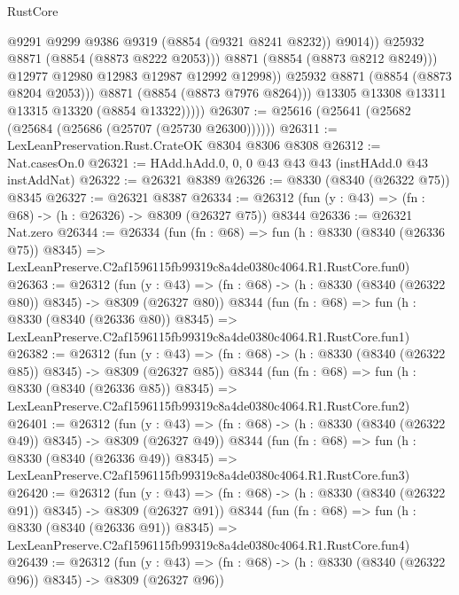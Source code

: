 \begin{lexlean}{RustCore}
\begin{coremodule}
                            @9291
                            @9299
                            @9386
                            @9319
                            (@8854 (@9321 @8241 @8232))
                            @9014))
                        @25932
                        @8871
                        (@8854 (@8873 @8222 @2053)))
                      @8871
                      (@8854 (@8873 @8212 @8249)))
                    @12977
                    @12980
                    @12983
                    @12987
                    @12992
                    @12998))
                @25932
                @8871
                (@8854 (@8873 @8204 @2053)))
              @8871
              (@8854 (@8873 @7976 @8264)))
            @13305
            @13308
            @13311
            @13315
            @13320
            (@8854 @13322)))))
@26307 := @25616 (@25641 (@25682 (@25684 (@25686 (@25707 (@25730 @26300))))))
@26311 := LexLeanPreservation.Rust.CrateOK @8304 @8306 @8308
@26312 := Nat.casesOn.{0}
@26321 := HAdd.hAdd.{0, 0, 0} @43 @43 @43 (instHAdd.{0} @43 instAddNat)
@26322 := @26321 @8389
@26326 := @8330 (@8340 (@26322 @75)) @8345
@26327 := @26321 @8387
@26334 := @26312 (fun (y : @43) => (fn : @68) -> (h : @26326) -> @8309 (@26327 @75)) @8344
@26336 := @26321 Nat.zero
@26344 := @26334
    (fun (fn : @68) =>
    fun (h : @8330 (@8340 (@26336 @75)) @8345) =>
    LexLeanPreserve.C2af1596115fb99319c8a4de0380c4064.R1.RustCore.fun0)
@26363 := @26312
    (fun (y : @43) => (fn : @68) -> (h : @8330 (@8340 (@26322 @80)) @8345) -> @8309 (@26327 @80))
    @8344
    (fun (fn : @68) =>
    fun (h : @8330 (@8340 (@26336 @80)) @8345) =>
    LexLeanPreserve.C2af1596115fb99319c8a4de0380c4064.R1.RustCore.fun1)
@26382 := @26312
    (fun (y : @43) => (fn : @68) -> (h : @8330 (@8340 (@26322 @85)) @8345) -> @8309 (@26327 @85))
    @8344
    (fun (fn : @68) =>
    fun (h : @8330 (@8340 (@26336 @85)) @8345) =>
    LexLeanPreserve.C2af1596115fb99319c8a4de0380c4064.R1.RustCore.fun2)
@26401 := @26312
    (fun (y : @43) => (fn : @68) -> (h : @8330 (@8340 (@26322 @49)) @8345) -> @8309 (@26327 @49))
    @8344
    (fun (fn : @68) =>
    fun (h : @8330 (@8340 (@26336 @49)) @8345) =>
    LexLeanPreserve.C2af1596115fb99319c8a4de0380c4064.R1.RustCore.fun3)
@26420 := @26312
    (fun (y : @43) => (fn : @68) -> (h : @8330 (@8340 (@26322 @91)) @8345) -> @8309 (@26327 @91))
    @8344
    (fun (fn : @68) =>
    fun (h : @8330 (@8340 (@26336 @91)) @8345) =>
    LexLeanPreserve.C2af1596115fb99319c8a4de0380c4064.R1.RustCore.fun4)
@26439 := @26312
    (fun (y : @43) => (fn : @68) -> (h : @8330 (@8340 (@26322 @96)) @8345) -> @8309 (@26327 @96))

\end{coremodule}
\end{lexlean}
